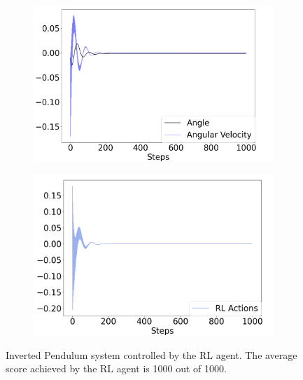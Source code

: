 \documentclass{IJCAS}
\begin{document}
\begin{figure}
\centering
\begin{subfigure}{0.25\textwidth}
\centering
\includegraphics[width=\linewidth]{ip_RL.png}
\label{fig:ip_pid}
\end{subfigure}%
\begin{subfigure}{.25\textwidth}
\centering
\includegraphics[width=\linewidth]{ip_RL_actions.png}
\label{fig:ip_pid_actions}
\end{subfigure}
\caption{Inverted Pendulum system controlled by the RL agent. The average score achieved by the RL agent is 1000 out of 1000.}
\label{fig:ip_rl}
\end{figure}
\end{document}
